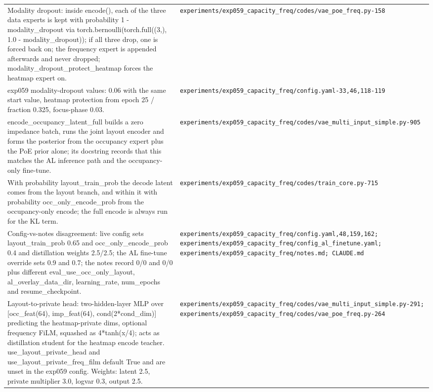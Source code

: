 \begin{longtable}{p{} p{}}
Modality dropout: inside encode(), each of the three data experts is kept with probability 1 - modality\_dropout via torch.bernoulli(torch.full((3,), 1.0 - modality\_dropout)); if all three drop, one is forced back on; the frequency expert is appended afterwards and never dropped; modality\_dropout\_protect\_heatmap forces the heatmap expert on. & \texttt{experiments/\allowbreak{}exp059\_\allowbreak{}capacity\_\allowbreak{}freq/\allowbreak{}codes/\allowbreak{}vae\_\allowbreak{}poe\_\allowbreak{}freq.py-158} \\
exp059 modality-dropout values: 0.06 with the same start value, heatmap protection from epoch 25 / fraction 0.325, focus-phase 0.03. & \texttt{experiments/\allowbreak{}exp059\_\allowbreak{}capacity\_\allowbreak{}freq/\allowbreak{}config.yaml-33,46,118-119} \\
encode\_occupancy\_latent\_full builds a zero impedance batch, runs the joint layout encoder and forms the posterior from the occupancy expert plus the PoE prior alone; its docstring records that this matches the AL inference path and the occupancy-only fine-tune. & \texttt{experiments/\allowbreak{}exp059\_\allowbreak{}capacity\_\allowbreak{}freq/\allowbreak{}codes/\allowbreak{}vae\_\allowbreak{}multi\_\allowbreak{}input\_\allowbreak{}simple.py-905} \\
With probability layout\_train\_prob the decode latent comes from the layout branch, and within it with probability occ\_only\_encode\_prob from the occupancy-only encode; the full encode is always run for the KL term. & \texttt{experiments/\allowbreak{}exp059\_\allowbreak{}capacity\_\allowbreak{}freq/\allowbreak{}codes/\allowbreak{}train\_\allowbreak{}core.py-715} \\
Config-vs-notes disagreement: live config sets layout\_train\_prob 0.65 and occ\_only\_encode\_prob 0.4 and distillation weights 2.5/2.5; the AL fine-tune override sets 0.9 and 0.7; the notes record 0/0 and 0/0 plus different eval\_use\_occ\_only\_layout, al\_overlay\_data\_dir, learning\_rate, num\_epochs and resume\_checkpoint. & \texttt{experiments/\allowbreak{}exp059\_\allowbreak{}capacity\_\allowbreak{}freq/\allowbreak{}config.yaml,48,159,162; experiments/\allowbreak{}exp059\_\allowbreak{}capacity\_\allowbreak{}freq/\allowbreak{}config\_\allowbreak{}al\_\allowbreak{}finetune.yaml; experiments/\allowbreak{}exp059\_\allowbreak{}capacity\_\allowbreak{}freq/\allowbreak{}notes.md; CLAUDE.md} \\
Layout-to-private head: two-hidden-layer MLP over [occ\_feat(64), imp\_feat(64), cond(2*cond\_dim)] predicting the heatmap-private dims, optional frequency FiLM, squashed as 4*tanh(x/4); acts as distillation student for the heatmap encode teacher. use\_layout\_private\_head and use\_layout\_private\_freq\_film default True and are unset in the exp059 config. Weights: latent 2.5, private multiplier 3.0, logvar 0.3, output 2.5. & \texttt{experiments/\allowbreak{}exp059\_\allowbreak{}capacity\_\allowbreak{}freq/\allowbreak{}codes/\allowbreak{}vae\_\allowbreak{}multi\_\allowbreak{}input\_\allowbreak{}simple.py-291; experiments/\allowbreak{}exp059\_\allowbreak{}capacity\_\allowbreak{}freq/\allowbreak{}codes/\allowbreak{}vae\_\allowbreak{}poe\_\allowbreak{}freq.py-264} \\

\end{longtable}
